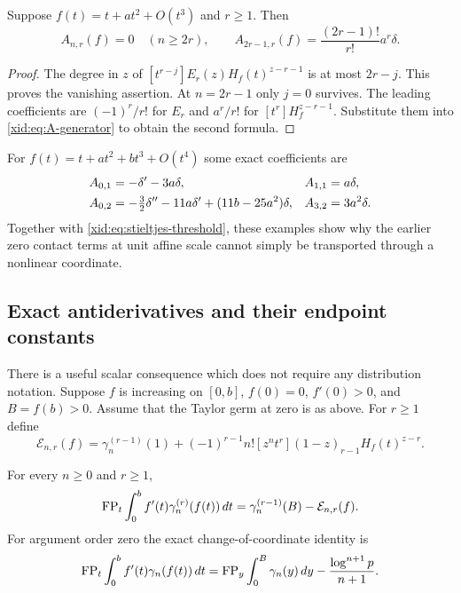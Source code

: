 \begin{corollary}
\label{xid:cor:stieltjes-threshold}
Suppose $f(t)=t+a t^2+O(t^3)$ and $r\ge1$.  Then
\begin{equation}\label{xid:eq:stieltjes-threshold}
 A_{n,r}(f)=0\quad(n\ge2r),\qquad
 A_{2r-1,r}(f)=\frac{(2r-1)!}{r!}a^r\delta.
\end{equation}
\end{corollary}

\begin{proof}
The degree in $z$ of
$[t^{r-j}]E_r(z)H_f(t)^{z-r-1}$ is at most $2r-j$.
This proves the vanishing assertion.  At $n=2r-1$ only $j=0$
survives.  The leading coefficients are $(-1)^r/r!$ for $E_r$
and $a^r/r!$ for $[t^r]H_f^{z-r-1}$.  Substitute them into
\eqref{xid:eq:A-generator} to obtain the second formula.
\end{proof}

For $f(t)=t+a t^2+b t^3+O(t^4)$ some exact coefficients are
\begin{align}
 A_{0,1}&=-\delta'-3a\delta,& A_{1,1}&=a\delta,\notag\\
 A_{0,2}&=-\tfrac32\delta''-11a\delta'
                       +(11b-25a^2)\delta,&
 A_{3,2}&=3a^2\delta.\label{xid:eq:A-table}
\end{align}
Together with \eqref{xid:eq:stieltjes-threshold}, these examples show why
the earlier zero contact terms at unit affine scale cannot simply be
transported through a nonlinear coordinate.

\subsection{Exact antiderivatives and their endpoint constants}

There is a useful scalar consequence which does not require any
distribution notation.  Suppose $f$ is increasing on $[0,b]$,
$f(0)=0$, $f'(0)>0$, and $B=f(b)>0$.  Assume that the Taylor germ at
zero is as above.  For $r\ge1$ define
\begin{equation}\label{xid:eq:primitive-E}
 \mathcal E_{n,r}(f)=\gamma_n^{(r-1)}(1)
 +(-1)^{r-1}n![z^nt^r](1-z)_{r-1}H_f(t)^{z-r}.
\end{equation}

\begin{theorem}
\label{xid:thm:nonlinear-primitive}
For every $n\ge0$ and $r\ge1$,
\begin{equation}\label{xid:eq:nonlinear-primitive}
 \operatorname{FP}_t\int_0^b f'(t)\gamma_n^{(r)}(f(t))\,dt
       =\gamma_n^{(r-1)}(B)-\mathcal E_{n,r}(f).
\end{equation}
For argument order zero the exact change-of-coordinate identity is
\begin{equation}\label{xid:eq:primitive-order0}
 \operatorname{FP}_t\int_0^b f'(t)\gamma_n(f(t))\,dt
 =\operatorname{FP}_y\int_0^B\gamma_n(y)\,dy
       -\frac{\log^{n+1}p}{n+1}.
\end{equation}
\end{theorem}

